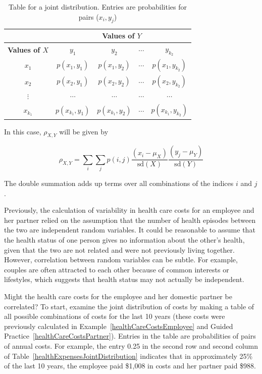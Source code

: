 \begin{table}[h]
	\caption{Table for a joint distribution. Entries are probabilities for pairs ($x_i, y_j$)}
	\label{table:generalJointDistribution}
	\centering
	\begin{tabular}{ccccc}
		\hline
		& \multicolumn{4}{c}{\textbf{Values of $Y$}} \\
		\hline
		\textbf{Values of $X$} & $y_1$ & $y_2$ & $\cdots$ & $y_{k_2}$ \\
		$x_1$ &   $p(x_1, y_1)$ &   $p(x_1, y_2)$  & $\cdots$  & $p(x_1, y_{k_2})$  \\
		$x_2$ &  $p(x_2, y_1)$   &  $p(x_2, y_2)$  & $\cdots$ &   $p(x_2, y_{k_2})$ \\
		$\vdots$ &   $\cdots$  &  $\cdots$  &  $\cdots$ &   $\cdots$ \\
		$x_{k_1}$ & $p(x_{k_1}, y_1)$ &  $p(x_{k_1}, y_2)$  &  $\cdots$ & $p(x_{k_1}, y_{k_2})$ \\
		
	\end{tabular}
\end{table}

In this case, $\rho_{X,Y}$ will be given by

\begin{equation}
\rho_{X,Y} = \sum_{i} \sum_{j} p(i,j)\frac{(x_i - \mu_X)}{\textrm{sd}(X)}\frac{(y_j - \mu_Y)}{\textrm{sd}(Y)}
\label{eq:specificFormulaCorrelation}
\end{equation}

The double summation adds up terms over all combinations of the indices $i$ and $j$.

Previously, the calculation of variability in health care costs for an employee and her partner relied on the assumption that the number of health episodes between the two are independent random variables. It could be reasonable to assume that the health status of one person gives no information about the other's health, given that the two are not related and were not previously living together. However, correlation between random variables can be subtle. For example, couples are often attracted to each other because of common interests or lifestyles, which suggests that health status may not actually be independent.

Might the health care costs for the employee and her domestic partner be correlated? To start, examine the joint distribution of costs by making a table of all possible combinations of costs for the last 10 years (these costs were previously calculated in Example~\ref{healthCareCostsEmployee} and Guided Practice~\ref{healthCareCostsPartner}). Entries in the table are probabilities of pairs of annual costs. For example, the entry 0.25 in the second row and second column of Table~\ref{healthExpensesJointDistribution} indicates that in approximately 25\% of the last 10 years, the employee paid \$1,008 in costs and her partner paid \$988.

